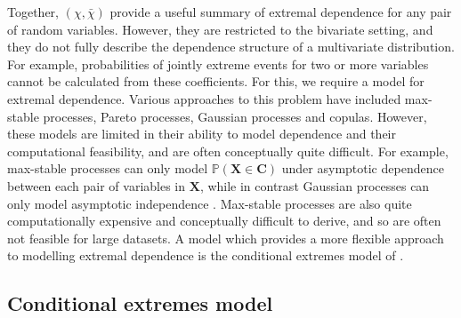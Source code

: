 \documentclass{article}
\numberwithin{equation}{section}
\begin{document}
Together, $(\chi, \bar{\chi})$ provide a useful summary of extremal dependence for any pair of random variables.
However, they are restricted to the bivariate setting, and they do not fully describe the dependence structure of a multivariate distribution.
For example, probabilities of jointly extreme events for two or more variables cannot be calculated from these coefficients.
For this, we require a model for extremal dependence.
Various approaches to this problem have included max-stable processes, Pareto processes, Gaussian processes and copulas.
However, these models are limited in their ability to model dependence and their computational feasibility, and are often conceptually quite difficult. 
For example, max-stable processes can only model $\mathbb{P}(\bm{X} \in \bm{C})$ under asymptotic dependence between each pair of variables in $\bm{X}$, while in contrast Gaussian processes can only model asymptotic independence \citep{Tawn2018} \citep{Huser2024}.
Max-stable processes are also quite computationally expensive and conceptually difficult to derive, and so are often not feasible for large datasets.
A model which provides a more flexible approach to modelling extremal dependence is the conditional extremes model of \cite{Heffernan2004}.


\subsection{Conditional extremes model}

\end{document}
